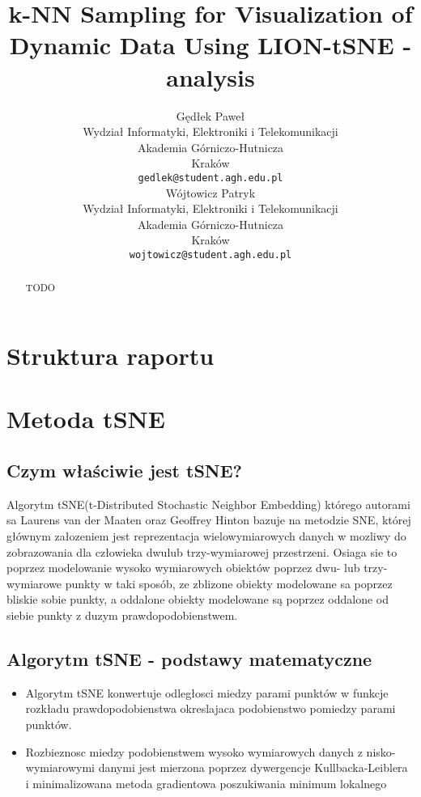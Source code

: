 \documentclass{article}
\title{k-NN Sampling for Visualization of Dynamic Data Using LION-tSNE - analysis}
\author{
 Gędłek Paweł \\
  Wydział Informatyki, Elektroniki i Telekomunikacji\\
  Akademia Górniczo-Hutnicza \\
  Kraków \\
  \texttt{gedlek@student.agh.edu.pl} \\
  \And
Wójtowicz Patryk \\
  Wydział Informatyki, Elektroniki i Telekomunikacji\\
  Akademia Górniczo-Hutnicza \\
  Kraków \\
  \texttt{wojtowicz@student.agh.edu.pl} \\
}
\begin{document}
\maketitle
\begin{abstract}
TODO
\end{abstract}




\section{Struktura raportu}
\label{sec:report_structure}
\paragraph{}
\tableofcontents

\section{Metoda tSNE}
\label{sec:tSNE}
\paragraph{}
\subsection{Czym właściwie jest tSNE?}
Algorytm tSNE(t-Distributed Stochastic Neighbor Embedding) którego
autorami sa Laurens van der Maaten oraz Geoffrey Hinton bazuje na
metodzie SNE, której głównym załozeniem jest reprezentacja
wielowymiarowych danych w mozliwy do zobrazowania dla człowieka dwulub
trzy-wymiarowej przestrzeni. Osiaga sie to poprzez modelowanie wysoko
wymiarowych obiektów poprzez dwu- lub trzy-wymiarowe punkty w taki
sposób, ze zblizone obiekty modelowane sa poprzez bliskie sobie punkty, a
oddalone obiekty modelowane są poprzez oddalone od siebie punkty z
duzym prawdopodobienstwem.

\subsection{Algorytm tSNE - podstawy matematyczne}
\begin{itemize}
\item 
Algorytm tSNE konwertuje odległosci miedzy parami punktów w
funkcje rozkładu prawdopodobienstwa okreslajaca podobienstwo
pomiedzy parami punktów.
\item 
Rozbieznosc miedzy podobienstwem wysoko wymiarowych danych z
nisko-wymiarowymi danymi jest mierzona poprzez dywergencje
Kullbacka-Leiblera i minimalizowana metoda gradientowa
poszukiwania minimum lokalnego
\end{itemize}
\end{document}

